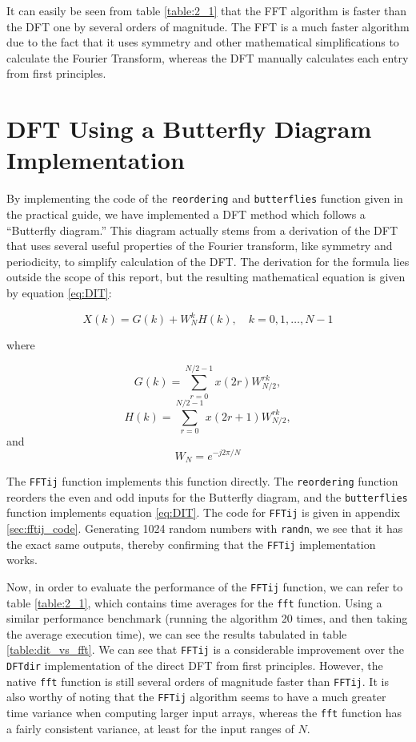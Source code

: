\documentclass[a4paper, 12pt]{report}
\begin{document}
			It can easily be seen from table \ref{table:2_1} that the FFT algorithm is faster than the DFT one by several orders of magnitude. The FFT is a much faster algorithm due to the fact that it uses symmetry and other mathematical simplifications to calculate the Fourier Transform, whereas the DFT manually calculates each entry from first principles.

		\section{DFT Using a Butterfly Diagram Implementation} %
		\label{sec:dft_using_a_butterfly_diagram}
			By implementing the code of the \texttt{reordering} and \texttt{butterflies} function given in the practical guide, we have implemented a DFT method which follows a ``Butterfly diagram.'' This diagram actually stems from a derivation of the DFT that uses several useful properties of the Fourier transform, like symmetry and periodicity, to simplify calculation of the DFT. The derivation for the formula lies outside the scope of this report, but the resulting mathematical equation is given by equation \ref{eq:DIT}:

			\begin{equation}
				X(k) = G(k) + W_N^k H(k), \quad k = 0, 1, \ldots, N-1
				\label{eq:DIT}
			\end{equation}

			\noindent where

			\[
				G(k) = \sum_{r = 0}^{N/2 - 1} x(2r) W_{N/2}^{rk},
			\]
			\[
				H(k) = \sum_{r = 0}^{N/2 - 1} x(2r + 1) W_{N/2}^{rk},
			\]
			\noindent and
			\[
				W_N = e^{-j2 \pi/N}
			\]

			The \texttt{FFTij} function implements this function directly. The \texttt{reordering} function reorders the even and odd inputs for the Butterfly diagram, and the \texttt{butterflies} function implements equation \ref{eq:DIT}. The code for \texttt{FFTij} is given in appendix \ref{sec:fftij_code}. Generating 1024 random numbers with \texttt{randn}, we see that it has the exact same outputs, thereby confirming that the \texttt{FFTij} implementation works.

			Now, in order to evaluate the performance of the \texttt{FFTij} function, we can refer to table \ref{table:2_1}, which contains time averages for the \texttt{fft} function. Using a similar performance benchmark (running the algorithm 20 times, and then taking the average execution time), we can see the results tabulated in table \ref{table:dit_vs_fft}. We can see that \texttt{FFTij} is a considerable improvement over the \texttt{DFTdir} implementation of the direct DFT from first principles. However, the native \texttt{fft} function is still several orders of magnitude faster than \texttt{FFTij}. It is also worthy of noting that the \texttt{FFTij} algorithm seems to have a much greater time variance when computing larger input arrays, whereas the \texttt{fft} function has a fairly consistent variance, at least for the input ranges of $N$.
\end{document}
